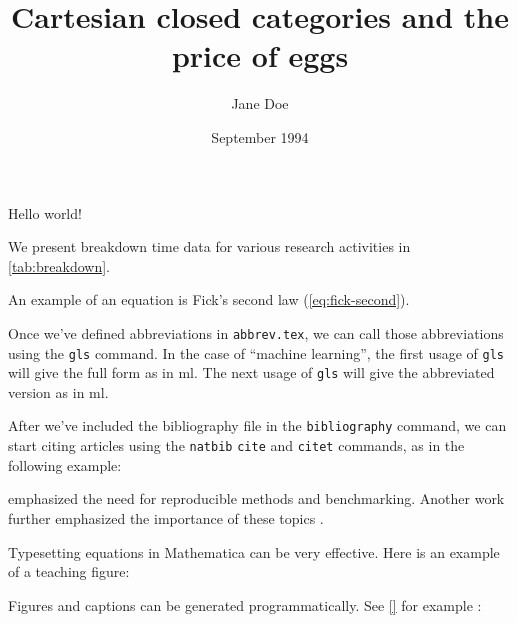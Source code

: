 \documentclass[preprint,12pt]{elsarticle}
\title{Cartesian closed categories and the price of eggs}
\author{Jane Doe}
\date{September 1994}
\begin{document}
   \maketitle
   Hello world!

We present breakdown time data for various research activities in \cref{tab:breakdown}.


An example of an equation is Fick's second law (\cref{eq:fick-second}).


Once we've defined abbreviations in \texttt{abbrev.tex}, we can call those abbreviations using the \texttt{gls} command. In the case of ``machine learning'', the first usage of \texttt{gls} will give the full form as in \gls{ml}. The next usage of \texttt{gls} will give the abbreviated version as in \gls{ml}.

After we've included the bibliography file in the \texttt{bibliography} command, we can start citing articles using the \texttt{natbib} \texttt{cite} and \texttt{citet} commands, as in the following example:

\citet{wangMachineLearningMaterials2020a} emphasized the need for reproducible methods and benchmarking. Another work further emphasized the importance of these topics \cite{barnardBestPracticeLeads2020}.

Typesetting equations in Mathematica can be very effective. Here is an example of a teaching figure: \\ %

\resizebox{.9\hsize}{!}{}

Figures and captions can be generated programmatically. See \cref{} for example :



\printglossaries



\end{document}
